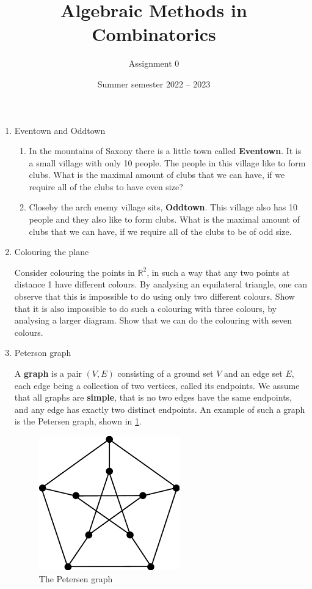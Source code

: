 \documentclass[kulak]{tplt}
\title{Algebraic Methods in Combinatorics}
\author{Assignment 0}
\date{Summer semester 2022 -- 2023}
\theoremstyle{definition}
\newcommand{\R}{\mathbb{R}}
\begin{document}
\maketitle
\begin{enumerate}
\item Eventown and Oddtown

\begin{enumerate}
\item In the mountains of Saxony there is a little town called \textbf{Eventown}.
It is a small village with only 10 people.
The people in this village like to form clubs.
What is the maximal amount of clubs that we can have, if we require all of the clubs to have even size?

\item Closeby the arch enemy village sits, \textbf{Oddtown}.
This village also has 10 people and they also like to form clubs. 
What is the maximal amount of clubs that we can have, if we require all of the clubs to be of odd size.
\end{enumerate}

\item Colouring the plane

Consider colouring the points in $\R^2$, in such a way that any two points at distance 1 have different colours.
By analysing an equilateral triangle, one can observe that this is impossible to do using only two different colours.
Show that it is also impossible to do such a colouring with three colours, by analysing a larger diagram. 
Show that we can do the colouring with seven colours.

\item Peterson graph

A \textbf{graph} is a pair $(V, E)$ consisting of a ground set $V$ and an edge set $E$, each edge being a collection of two vertices, called its endpoints.
We assume that all graphs are \textbf{simple}, that is no two edges have the same endpoints, and any edge has exactly two distinct endpoints.
An example of such a graph is the Petersen graph, shown in \cref{fig:pet}.

\begin{figure}[h]
\centering
\includegraphics[scale=0.5]{../imgs/petersen.png}
\caption{The Petersen graph\label{fig:pet}}
\end{figure}



\end{enumerate}
\end{document}
